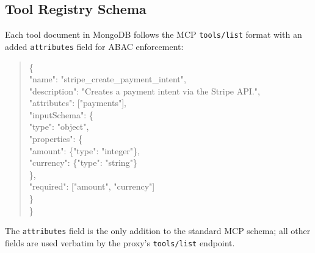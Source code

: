 \documentclass[11pt]{article}
\begin{document}
\subsection{Tool Registry Schema}

Each tool document in MongoDB follows the MCP \texttt{tools/list} format
with an added \texttt{attributes} field for ABAC enforcement:

\begin{quote}
\small\ttfamily
\{\\
\hspace*{1em}"name":        "stripe\_create\_payment\_intent",\\
\hspace*{1em}"description": "Creates a payment intent via the Stripe API.",\\
\hspace*{1em}"attributes":  ["payments"],\\
\hspace*{1em}"inputSchema": \{\\
\hspace*{2em}"type": "object",\\
\hspace*{2em}"properties": \{\\
\hspace*{3em}"amount":   \{"type": "integer"\},\\
\hspace*{3em}"currency": \{"type": "string"\}\\
\hspace*{2em}\},\\
\hspace*{2em}"required": ["amount", "currency"]\\
\hspace*{1em}\}\\
\}
\end{quote}

\noindent The \texttt{attributes} field is the only addition to the
standard MCP schema; all other fields are used verbatim by the proxy's
\texttt{tools/list} endpoint.
\end{document}
